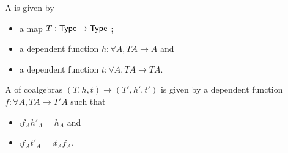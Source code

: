 \documentclass[envcountsame]{llncs}
\begin{document}
 
 
 \begin{definition}
  A  is given by
  \begin{itemize}
   \item a map $T : \mathsf{Type} \to \mathsf{Type}$ ;
   \item a dependent function $h : \forall A, TA \to A$ and
   \item a dependent function $t : \forall A, TA \to TA$.
  \end{itemize}
  
  A  of coalgebras $(T,h,t)\to (T',h',t')$ is given by 
  a dependent function $f : \forall A, TA \to T'A$ such that
   \begin{itemize}
    \item $\comp{f_A}{h'_A} = h_A$ and
    \item $\comp{f_A}{t'_A} = \comp{t_A}{f_A}$.
   \end{itemize}
 \end{definition}

 
 
\printbibliography


\appendix



% 
\end{document}

